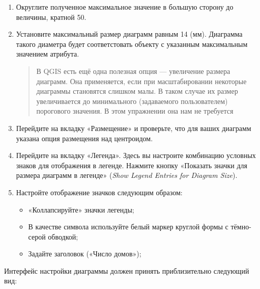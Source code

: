 \documentclass[
  12pt,
]{book}
\providecommand{\tightlist}{%
  \setlength{\itemsep}{0pt}\setlength{\parskip}{0pt}}
\begin{document}
\begin{enumerate}
\def\labelenumi{\arabic{enumi}.}
\setcounter{enumi}{5}
\item
  Округлите полученное максимальное значение в большую сторону до величины, кратной 50.
\item
  Установите максимальный размер диаграмм равным 14 (мм). Диаграмма такого диаметра будет соответстовать объекту с указанным максимальным значением атрибута.

  \begin{quote}
  В QGIS есть ещё одна полезная опция --- увеличение размера диаграмм. Она применяется, если при масштабировании некоторые диаграммы становятся слишком малы. В таком случае их размер увеличивается до минимального (задаваемого пользователем) порогового значения. В этом упражнении она нам не требуется
  \end{quote}
\item
  Перейдите на вкладку «Размещение» и проверьте, что для ваших диаграмм указана опция размещения над центроидом.
\item
  Перейдите на вкладку «Легенда». Здесь вы настроите комбинацию условных знаков для отображения в легенде. Нажмите кнопку «Показать значки для размера диаграмм в легенде» (\emph{Show Legend Entries for Diagram Size}).
\item
  Настройте отображение значков следующим образом:

  \begin{itemize}
  \tightlist
  \item
    «Коллапсируйте» значки легенды;
  \item
    В качестве символа используйте белый маркер круглой формы с тёмно-серой обводкой;
  \item
    Задайте заголовок («Число домов»);
  \end{itemize}
\end{enumerate}

Интерфейс настройки диаграммы должен принять приблизительно следующий вид:
\end{document}
